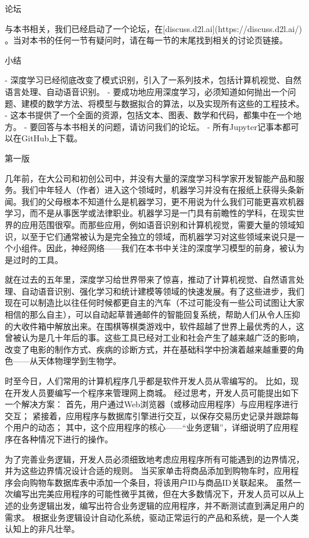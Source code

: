  论坛

与本书相关，我们已经启动了一个论坛，在[discuss.d2l.ai](https://discuss.d2l.ai/)
。当对本书的任何一节有疑问时，请在每一节的末尾找到相关的讨论页链接。

 小结

- 深度学习已经彻底改变了模式识别，引入了一系列技术，包括计算机视觉、自然语言处理、自动语音识别。
- 要成功地应用深度学习，必须知道如何抛出一个问题、建模的数学方法、将模型与数据拟合的算法，以及实现所有这些的工程技术。
- 这本书提供了一个全面的资源，包括文本、图表、数学和代码，都集中在一个地方。
- 要回答与本书相关的问题，请访问我们的论坛。
- 所有Jupyter记事本都可以在GitHub上下载。


第一版

几年前，在大公司和初创公司中，并没有大量的深度学习科学家开发智能产品和服务。我们中年轻人（作者）进入这个领域时，机器学习并没有在报纸上获得头条新闻。我们的父母根本不知道什么是机器学习，更不用说为什么我们可能更喜欢机器学习，而不是从事医学或法律职业。机器学习是一门具有前瞻性的学科，在现实世界的应用范围很窄。而那些应用，例如语音识别和计算机视觉，需要大量的领域知识，以至于它们通常被认为是完全独立的领域，而机器学习对这些领域来说只是一个小组件。因此，神经网络——我们在本书中关注的深度学习模型的前身，被认为是过时的工具。

就在过去的五年里，深度学习给世界带来了惊喜，推动了计算机视觉、自然语言处理、自动语音识别、强化学习和统计建模等领域的快速发展。有了这些进步，我们现在可以制造比以往任何时候都更自主的汽车（不过可能没有一些公司试图让大家相信的那么自主），可以自动起草普通邮件的智能回复系统，帮助人们从令人压抑的大收件箱中解放出来。在围棋等棋类游戏中，软件超越了世界上最优秀的人，这曾被认为是几十年后的事。这些工具已经对工业和社会产生了越来越广泛的影响，改变了电影的制作方式、疾病的诊断方式，并在基础科学中扮演着越来越重要的角色——从天体物理学到生物学。

时至今日，人们常用的计算机程序几乎都是软件开发人员从零编写的。 比如，现在开发人员要编写一个程序来管理网上商城。 经过思考，开发人员可能提出如下一个解决方案： 首先，用户通过Web浏览器（或移动应用程序）与应用程序进行交互； 紧接着，应用程序与数据库引擎进行交互，以保存交易历史记录并跟踪每个用户的动态； 其中，这个应用程序的核心——“业务逻辑”，详细说明了应用程序在各种情况下进行的操作。

为了完善业务逻辑，开发人员必须细致地考虑应用程序所有可能遇到的边界情况，并为这些边界情况设计合适的规则。 当买家单击将商品添加到购物车时，应用程序会向购物车数据库表中添加一个条目，将该用户ID与商品ID关联起来。 虽然一次编写出完美应用程序的可能性微乎其微，但在大多数情况下，开发人员可以从上述的业务逻辑出发，编写出符合业务逻辑的应用程序，并不断测试直到满足用户的需求。 根据业务逻辑设计自动化系统，驱动正常运行的产品和系统，是一个人类认知上的非凡壮举。

